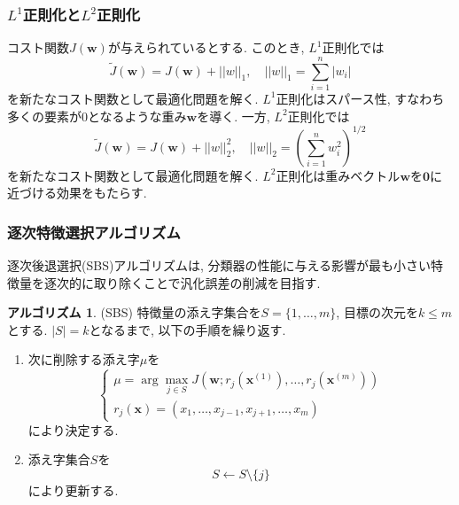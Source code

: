 \documentclass[uplatex]{jsarticle}
\theoremstyle{definition}
\newtheorem{algorithm}[definition]{アルゴリズム}
\numberwithin{equation}{section}
\newcommand{\norm}[1]{\left|\left|#1\right|\right|}
\begin{document}
\subsubsection{$L^{1}$正則化と$L^{2}$正則化}
コスト関数$J(\bm{w})$が与えられているとする.
このとき, $L^{1}$正則化では
\begin{equation}
    \tilde{J}(\bm{w}) = J(\bm{w}) + \norm{w}_{1}, \quad \norm{w}_{1} = \sum_{i = 1}^{n} |w_{i}|
\end{equation}
を新たなコスト関数として最適化問題を解く.
$L^{1}$正則化はスパース性, すなわち多くの要素が$0$となるような重み$\bm{w}$を導く.
一方, $L^{2}$正則化では
\begin{equation}
    \tilde{J}(\bm{w}) = J(\bm{w}) + \norm{w}_{2}^{2}, \quad \norm{w}_{2} = \left(\sum_{i = 1}^{n} w_{i}^{2}\right)^{1/2}
\end{equation}
を新たなコスト関数として最適化問題を解く.
$L^{2}$正則化は重みベクトル$\bm{w}$を$\bm{0}$に近づける効果をもたらす.

\subsubsection{逐次特徴選択アルゴリズム}
逐次後退選択(SBS)アルゴリズムは, 分類器の性能に与える影響が最も小さい特徴量を逐次的に取り除くことで汎化誤差の削減を目指す.
\begin{algorithm}
    (SBS)
    特徴量の添え字集合を$S = \{1, \dots, m\}$, 目標の次元を$k \leq m$とする.
    $|S| = k$となるまで, 以下の手順を繰り返す.
    \begin{enumerate}
        \item
        次に削除する添え字$\mu$を
        \begin{equation}
            \left\{
                \begin{aligned}
                    \mu = \arg\max_{j \in S} J(\bm{w}; r_{j}(\bm{x}^{(1)}), \dots, r_{j}(\bm{x}^{(m)})) \\
                    r_{j}(\bm{x}) = (x_{1}, \dots, x_{j - 1}, x_{j + 1}, \dots, x_{m})
                \end{aligned}
            \right.
        \end{equation}
        により決定する.
        \item
        添え字集合$S$を
        \begin{equation}
            S \leftarrow S \setminus \{j\}
        \end{equation}
        により更新する.
    \end{enumerate}
\end{algorithm}
\end{document}
